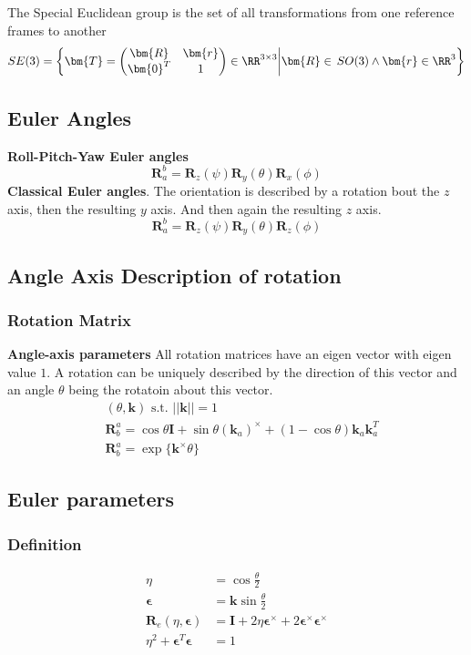 The Special Euclidean group is the set of all transformations from one reference frames to another
\[
SE(3) = \left\{\bm{T} = \begin{pmatrix}\bm{R} & \bm{r} \\ \bm{0}^T & 1 \end{pmatrix}\in\RR^{3\times3}\middle|\bm{R}\in\,SO(3) \wedge \bm{r}\in\RR^3\right\}
\]

\setcounter{subsection}{4}
\subsection{Euler Angles} %


\textbf{Roll-Pitch-Yaw Euler angles}
\[\bm{R}_a^b = \bm{R}_z(\psi)\bm{R}_y(\theta)\bm{R}_x(\phi)\]
\textbf{Classical Euler angles}. The orientation is described by a rotation bout the \(z\) axis, then the resulting \(y\) axis. And then again the resulting \(z\) axis.
\[\bm{R}_a^b = \bm{R}_z(\psi)\bm{R}_y(\theta)\bm{R}_z(\phi)\]

\subsection{Angle Axis Description of rotation} %
\setcounter{subsubsection}{4}
\subsubsection{Rotation Matrix}

\textbf{Angle-axis parameters} All rotation matrices have an eigen vector with eigen value \(1\). A rotation can be uniquely described by the direction of this vector and an angle \(\theta\) being the rotatoin about this vector.
\begin{align*}
    & (\theta,\bm{k})\text{ s.t. }||\bm{k}|| = 1 \\
    & \bm{R}_b^a = \cos\theta\bm{I} + \sin\theta(\bm{k}_a)^\times + (1-\cos\theta)\bm{k}_a\bm{k}_a^T \\
    & \bm{R}_b^a = \exp\{\bm{k}^\times\theta\}
\end{align*}

\subsection{Euler parameters} %
\subsubsection{Definition}
\begin{align*}
    \eta &= \cos\frac{\theta}{2} \\
    \bm{\epsilon} &= \bm{k}\sin\frac{\theta}{2} \\
    \bm{R}_e(\eta,\bm{\epsilon}) &= \bm{I} + 2\eta\bm{\epsilon}^\times + 2\bm{\epsilon}^\times\bm{\epsilon}^\times \\
    \eta^2 + \bm{\epsilon}^T\bm{\epsilon} &= 1
\end{align*}

